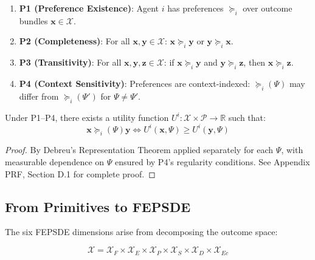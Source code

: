 \begin{enumerate}
\item \textbf{P1 (Preference Existence)}: Agent $i$ has preferences $\succeq_i$
over outcome bundles $\mathbf{x} \in \mathcal{X}$.

\item \textbf{P2 (Completeness)}: For all $\mathbf{x}, \mathbf{y} \in \mathcal{X}$:
$\mathbf{x} \succeq_i \mathbf{y}$ or $\mathbf{y} \succeq_i \mathbf{x}$.

\item \textbf{P3 (Transitivity)}: For all $\mathbf{x}, \mathbf{y}, \mathbf{z} \in \mathcal{X}$:
if $\mathbf{x} \succeq_i \mathbf{y}$ and $\mathbf{y} \succeq_i \mathbf{z}$, then
$\mathbf{x} \succeq_i \mathbf{z}$.

\item \textbf{P4 (Context Sensitivity)}: Preferences are context-indexed:
$\succeq_i(\Psi)$ may differ from $\succeq_i(\Psi')$ for $\Psi \neq \Psi'$.
\end{enumerate}

\begin{proposition}
Under P1--P4, there exists a utility function $U^i: \mathcal{X} \times \mathcal{P} \to \mathbb{R}$
such that:
\begin{equation}
\mathbf{x} \succeq_i(\Psi) \mathbf{y} \Leftrightarrow U^i(\mathbf{x}, \Psi) \geq U^i(\mathbf{y}, \Psi)
\end{equation}
\end{proposition}

\begin{proof}
By Debreu's Representation Theorem applied separately for each $\Psi$, with
measurable dependence on $\Psi$ ensured by P4's regularity conditions.
See Appendix PRF, Section D.1 for complete proof.
\end{proof}

\subsection{From Primitives to FEPSDE}

The six FEPSDE dimensions arise from decomposing the outcome space:

\begin{equation}
\mathcal{X} = \mathcal{X}_F \times \mathcal{X}_E \times \mathcal{X}_P \times
\mathcal{X}_S \times \mathcal{X}_D \times \mathcal{X}_{Ec}
\end{equation}

